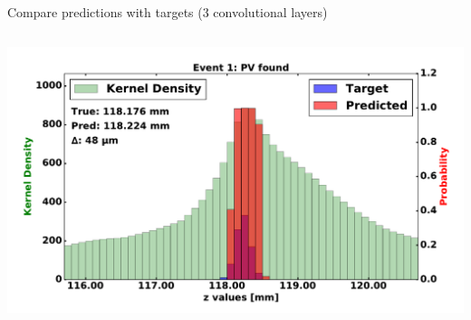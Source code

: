 \begin{frame}{Compare predictions with targets (3 convolutional layers)}
\begin{columns}[c]
\begin{center}
           \includegraphics[width=1\textwidth, height=0.45\textwidth, trim=18 0 18 0]{images/120000_3layer_07.pdf}
       \end{center}
  \end{columns}
\end{frame}

